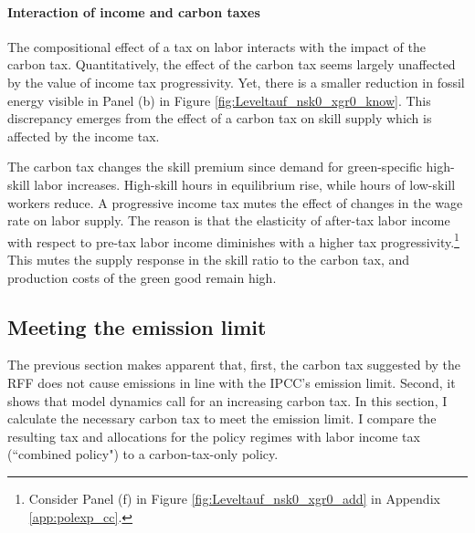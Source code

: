  
  
\paragraph{Interaction of income and carbon taxes}
The compositional effect of a tax on labor interacts with the impact of the carbon tax.
  Quantitatively, the effect of the carbon tax seems largely unaffected by the value of income tax progressivity.
 Yet, there is a smaller reduction in fossil energy visible in Panel (b) in Figure \ref{fig:Leveltauf_nsk0_xgr0_know}.
This discrepancy emerges from the effect of a carbon tax on skill supply which is affected by the income tax. 

    The carbon tax changes the skill premium since demand for green-specific high-skill labor increases. High-skill hours in equilibrium rise, while hours of low-skill workers reduce.  A progressive income tax mutes the effect of changes in the wage rate on labor supply. The reason is that the elasticity of after-tax labor income with respect to pre-tax labor income diminishes with a higher tax progressivity.\footnote{Consider Panel (f) in Figure \ref{fig:Leveltauf_nsk0_xgr0_add} in Appendix \ref{app:polexp_cc}.} This mutes the supply response in the skill ratio to the carbon tax, and production costs of the green good remain high.
   
  
\subsection{Meeting the emission limit}\label{subsec:meetlim}
 
The previous section makes apparent that, first, the carbon tax suggested by the RFF does not cause emissions in line with the IPCC's emission limit.  Second, it shows that model dynamics call for an increasing carbon tax. In this section, I calculate the necessary carbon tax to meet the emission limit. I compare the resulting tax and allocations for the policy regimes with labor income tax (``combined policy") to a carbon-tax-only policy.
 


